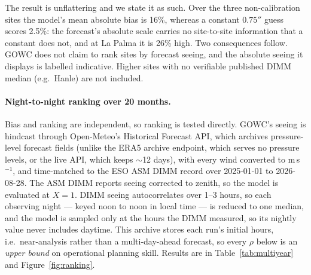 \documentclass[11pt]{article}
\begin{document}
The result is unflattering and we state it as such. Over the three non-calibration
sites the model's mean absolute bias is 16\%, whereas a constant $0.75''$ guess
scores 2.5\%: the forecast's absolute scale carries no site-to-site information that
a constant does not, and at La Palma it is 26\% high. Two consequences follow. GOWC
does not claim to rank sites by forecast seeing, and the absolute seeing it displays
is labelled indicative. Higher sites with no verifiable published DIMM median
(e.g.\ Hanle) are not included.

\paragraph{Night-to-night ranking over 20 months.} Bias and ranking are independent,
so ranking is tested directly. GOWC's seeing is hindcast through Open-Meteo's
Historical Forecast API, which archives pressure-level forecast fields (unlike the
ERA5 archive endpoint, which serves no pressure levels, or the live API, which keeps
$\sim$12 days), with every wind converted to m\,s$^{-1}$, and time-matched to the ESO
ASM DIMM record over 2025-01-01 to 2026-08-28. The ASM DIMM reports seeing corrected
to zenith, so the model is evaluated at $X=1$. DIMM seeing autocorrelates over 1--3
hours, so each observing night --- keyed noon to noon in local time --- is reduced to
one median, and the model is sampled only at the hours the DIMM measured, so its
nightly value never includes daytime. This archive stores each run's initial hours,
i.e.\ near-analysis rather than a multi-day-ahead forecast, so every $\rho$ below is an
\emph{upper bound} on operational planning skill. Results are in
Table~\ref{tab:multiyear} and Figure~\ref{fig:ranking}.
\end{document}
